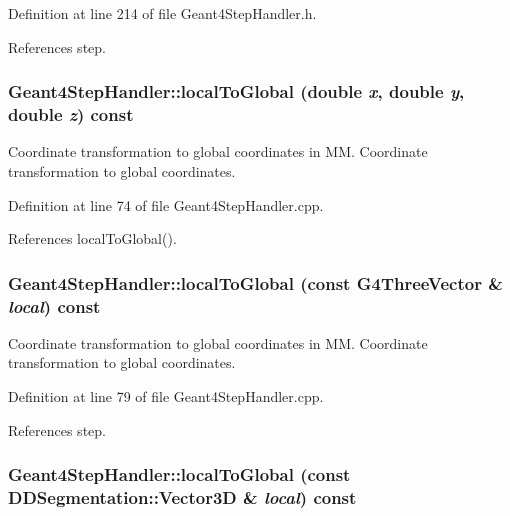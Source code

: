 Definition at line 214 of file Geant4StepHandler.h.

References step.\hypertarget{class_d_d4hep_1_1_simulation_1_1_geant4_step_handler_a6c3a63a6514cc13aace2f1d85ae3cef3}{
\subsubsection[{localToGlobal}]{ Geant4StepHandler::localToGlobal (double {\em x}, \/  double {\em y}, \/  double {\em z}) const}}
\label{class_d_d4hep_1_1_simulation_1_1_geant4_step_handler_a6c3a63a6514cc13aace2f1d85ae3cef3}


Coordinate transformation to global coordinates in MM. Coordinate transformation to global coordinates. 

Definition at line 74 of file Geant4StepHandler.cpp.

References localToGlobal().\hypertarget{class_d_d4hep_1_1_simulation_1_1_geant4_step_handler_a8854ed1b3496d3630144f659f67d203e}{
\subsubsection[{localToGlobal}]{ Geant4StepHandler::localToGlobal (const G4ThreeVector \& {\em local}) const}}
\label{class_d_d4hep_1_1_simulation_1_1_geant4_step_handler_a8854ed1b3496d3630144f659f67d203e}


Coordinate transformation to global coordinates in MM. Coordinate transformation to global coordinates. 

Definition at line 79 of file Geant4StepHandler.cpp.

References step.\hypertarget{class_d_d4hep_1_1_simulation_1_1_geant4_step_handler_aa2d8418b5a6009da51dc6c70cb7c22f2}{
\subsubsection[{localToGlobal}]{ Geant4StepHandler::localToGlobal (const {\bf DDSegmentation::Vector3D} \& {\em local}) const}}
\label{class_d_d4hep_1_1_simulation_1_1_geant4_step_handler_aa2d8418b5a6009da51dc6c70cb7c22f2}


